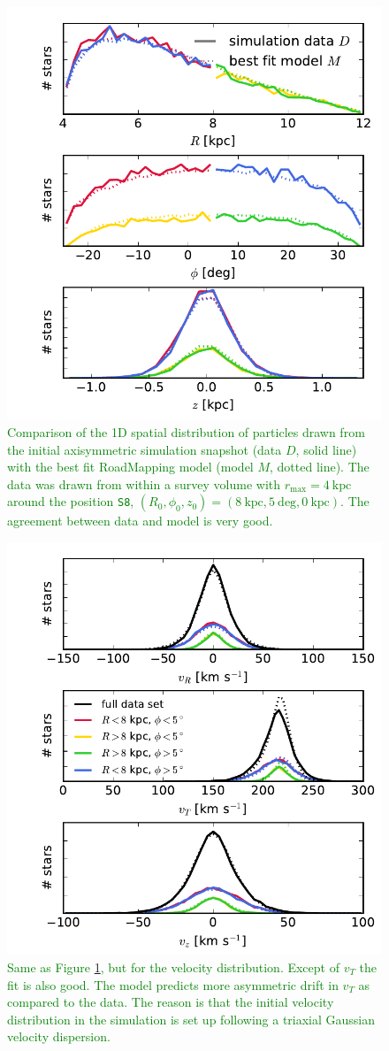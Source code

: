 \documentclass[10pt,a4paper]{article}
\newcommand{\Answer}[1]{\textcolor{Green}{#1}}
\begin{document}
\begin{figure}[!htbp]
\centering
\includegraphics[width=0.7\columnwidth]{fig/MNdHHinit_4kpc8Spiral_a_test1_data_bestfit_residuals_3b.pdf}
\caption{\Answer{Comparison of the 1D spatial distribution of particles drawn from the initial axisymmetric simulation snapshot (data $D$, solid line) with the best fit RoadMapping model (model $M$, dotted line). The data was drawn from within a survey volume with $r_\text{max}=4~\text{kpc}$ around the position \texttt{S8}, $(R_0,\phi_0,z_0)=(8~\text{kpc},5~\text{deg},0~\text{kpc})$. The agreement between data and model is very good.}}
\label{fig:MNinit_spatial}
\end{figure}

\begin{figure}[!htbp]
\centering
\includegraphics[width=0.7\columnwidth]{fig/MNdHHinit_4kpc8Spiral_a_test1_data_bestfit_residuals_3c.pdf}
\caption{\Answer{Same as Figure \ref{fig:MNinit_spatial}, but for the velocity distribution. Except of $v_T$ the fit is also good. The model predicts more asymmetric drift in $v_T$ as compared to the data. The reason is that the initial velocity distribution in the simulation is set up following a triaxial Gaussian velocity dispersion.}}
\end{figure}
\end{document}
